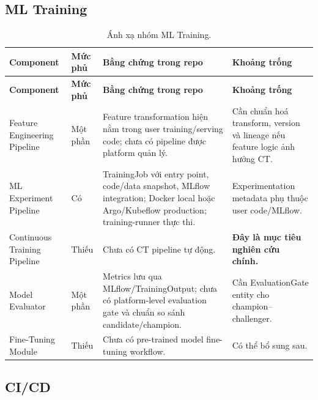 \documentclass[11pt,a4paper]{article}
\newcommand{\statusyes}{\textcolor{green!45!black}{Có}}
\newcommand{\statuspartial}{\textcolor{orange!75!black}{Một phần}}
\newcommand{\statusno}{\textcolor{red!60!black}{Thiếu}}
\begin{document}
\subsection{ML Training}

\begin{longtable}{@{}P{2.6cm}P{1.6cm}P{4.7cm}P{4.5cm}@{}}
\caption{Ánh xạ nhóm ML Training.}\\
\toprule
\textbf{Component} & \textbf{Mức phủ} & \textbf{Bằng chứng trong repo} & \textbf{Khoảng trống} \\
\midrule
\endfirsthead
\toprule
\textbf{Component} & \textbf{Mức phủ} & \textbf{Bằng chứng trong repo} & \textbf{Khoảng trống} \\
\midrule
\endhead
Feature Engineering Pipeline & \statuspartial & Feature transformation hiện nằm trong user training/serving code; chưa có pipeline được platform quản lý. & Cần chuẩn hoá transform, version và lineage nếu feature logic ảnh hưởng CT. \\
\addlinespace
ML Experiment Pipeline & \statusyes & TrainingJob với entry point, code/data snapshot, MLflow integration; Docker local hoặc Argo/Kubeflow production; training-runner thực thi. & Experimentation metadata phụ thuộc user code/MLflow. \\
\addlinespace
Continuous Training Pipeline & \statusno & Chưa có CT pipeline tự động. & \textbf{Đây là mục tiêu nghiên cứu chính.} \\
\addlinespace
Model Evaluator & \statuspartial & Metrics lưu qua MLflow/TrainingOutput; chưa có platform-level evaluation gate và chuẩn so sánh candidate/champion. & Cần EvaluationGate entity cho champion--challenger. \\
\addlinespace
Fine-Tuning Module & \statusno & Chưa có pre-trained model fine-tuning workflow. & Có thể bổ sung sau. \\
\bottomrule
\end{longtable}

\subsection{CI/CD}
\end{document}

